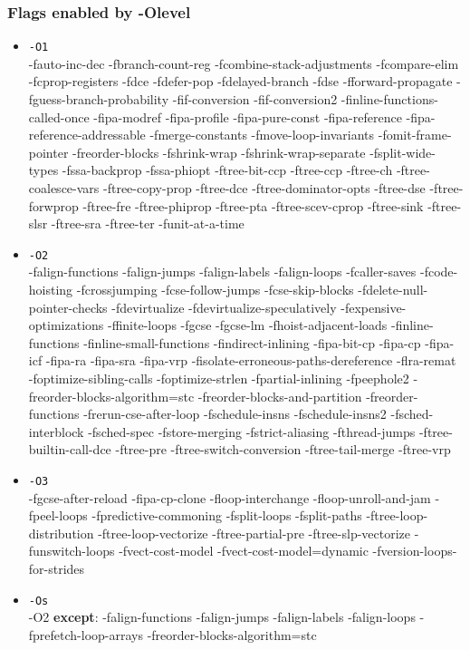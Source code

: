 \documentclass{beamer}
\begin{document}
\begin{frame}
\frametitle{Flags enabled by -Olevel}

\begin{itemize}
  \item{\texttt{-O1}} \\
  {\tiny\setstretch{0.4ex} -fauto-inc-dec -fbranch-count-reg -fcombine-stack-adjustments -fcompare-elim -fcprop-registers -fdce -fdefer-pop -fdelayed-branch -fdse -fforward-propagate -fguess-branch-probability -fif-conversion -fif-conversion2 -finline-functions-called-once -fipa-modref -fipa-profile -fipa-pure-const -fipa-reference -fipa-reference-addressable -fmerge-constants -fmove-loop-invariants -fomit-frame-pointer -freorder-blocks -fshrink-wrap -fshrink-wrap-separate -fsplit-wide-types -fssa-backprop -fssa-phiopt -ftree-bit-ccp -ftree-ccp -ftree-ch -ftree-coalesce-vars -ftree-copy-prop -ftree-dce -ftree-dominator-opts -ftree-dse -ftree-forwprop -ftree-fre -ftree-phiprop -ftree-pta -ftree-scev-cprop -ftree-sink -ftree-slsr -ftree-sra -ftree-ter -funit-at-a-time \\
    }

  \item{\texttt{-O2}} \\
  {\tiny\setstretch{0.4ex} -falign-functions  -falign-jumps -falign-labels  -falign-loops -fcaller-saves -fcode-hoisting -fcrossjumping -fcse-follow-jumps  -fcse-skip-blocks -fdelete-null-pointer-checks -fdevirtualize  -fdevirtualize-speculatively -fexpensive-optimizations -ffinite-loops -fgcse  -fgcse-lm -fhoist-adjacent-loads -finline-functions -finline-small-functions -findirect-inlining -fipa-bit-cp  -fipa-cp  -fipa-icf -fipa-ra  -fipa-sra  -fipa-vrp -fisolate-erroneous-paths-dereference -flra-remat -foptimize-sibling-calls -foptimize-strlen -fpartial-inlining -fpeephole2 -freorder-blocks-algorithm=stc -freorder-blocks-and-partition  -freorder-functions -frerun-cse-after-loop -fschedule-insns  -fschedule-insns2 -fsched-interblock  -fsched-spec -fstore-merging -fstrict-aliasing -fthread-jumps -ftree-builtin-call-dce -ftree-pre -ftree-switch-conversion  -ftree-tail-merge -ftree-vrp \\
    }

  \item{\texttt{-O3}}\\
  {\tiny\setstretch{0.4ex} -fgcse-after-reload -fipa-cp-clone -floop-interchange -floop-unroll-and-jam -fpeel-loops -fpredictive-commoning -fsplit-loops -fsplit-paths -ftree-loop-distribution -ftree-loop-vectorize -ftree-partial-pre -ftree-slp-vectorize -funswitch-loops -fvect-cost-model -fvect-cost-model=dynamic -fversion-loops-for-strides \\
    }

  \item{\texttt{-Os}}\\
  {\tiny\setstretch{0.4ex} -O2 \textbf{except}:
-falign-functions -falign-jumps -falign-labels -falign-loops -fprefetch-loop-arrays -freorder-blocks-algorithm=stc \\
    }
\end{itemize}

\end{frame}
\end{document}
